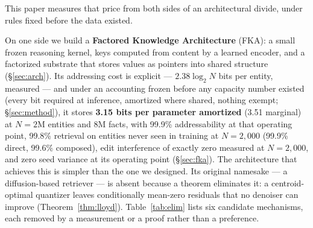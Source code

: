 This paper measures that price from both sides of an architectural divide, under rules fixed before the data existed.

On one side we build a \textbf{Factored Knowledge Architecture} (FKA): a small frozen reasoning kernel, keys computed from content by a learned encoder, and a factorized substrate that stores values as pointers into shared structure (\S\ref{sec:arch}). Its addressing cost is explicit --- $2.38\log_2 N$ bits per entity, measured --- and under an accounting frozen before any capacity number existed (every bit required at inference, amortized where shared, nothing exempt; \S\ref{sec:method}), it stores \textbf{3.15 bits per parameter amortized} (3.51 marginal) at $N = 2$M entities and 8M facts, with 99.9\% addressability at that operating point, 99.8\% retrieval on entities never seen in training at $N = 2{,}000$ (99.9\% direct, 99.6\% composed), edit interference of exactly zero measured at $N = 2{,}000$, and zero seed variance at its operating point (\S\ref{sec:fka}). %
The architecture that achieves this is simpler than the one we designed. Its original namesake --- a diffusion-based retriever --- is absent because a theorem eliminates it: a centroid-optimal quantizer leaves conditionally mean-zero residuals that no denoiser can improve (Theorem~\ref{thm:lloyd}). Table~\ref{tab:elim} lists six candidate mechanisms, each removed by a measurement or a proof rather than a preference.

